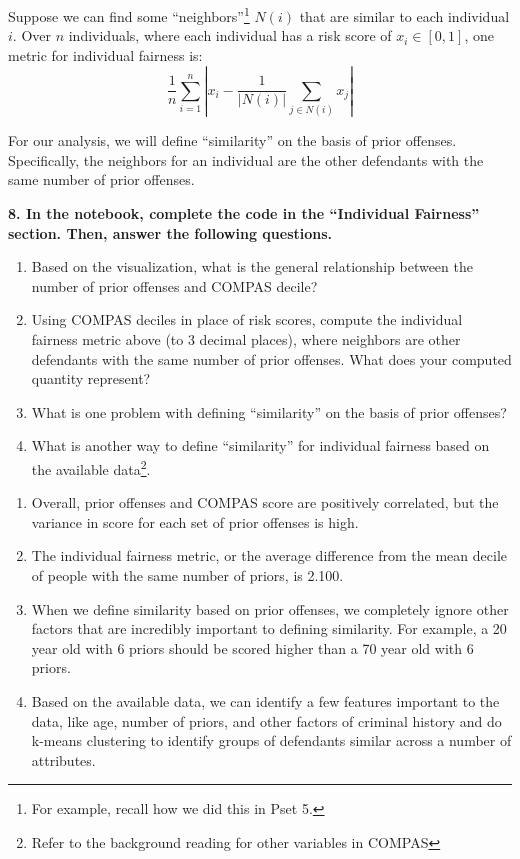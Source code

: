 \documentclass{article}
\begin{document}
Suppose we can find some ``neighbors''\footnote{For example, recall how we did this in Pset 5.} $N(i)$ that are similar to each individual $i$. Over $n$ individuals, where each individual has a risk score of $x_i \in [0,1]$, one metric for individual fairness is: 
$$\frac{1}{n} \sum_{i=1}^{n} \left| x_i - \frac{1}{|N(i)|} \sum_{j \in N(i)} x_j \right|$$

For our analysis, we will define ``similarity'' on the basis of prior offenses. Specifically, the neighbors for an individual are the other defendants with the same number of prior offenses.  

\textbf{8. In the notebook, complete the code in the ``Individual Fairness'' section. Then, answer the following questions.}
\begin{enumerate}[label=\Alph*.]
\item Based on the visualization, what is the general relationship between the number of prior offenses and COMPAS decile?
\item Using COMPAS deciles in place of risk scores, compute the individual fairness metric above (to 3 decimal places), where neighbors are other defendants with the same number of prior offenses. What does your computed quantity represent? 
\item What is one problem with defining ``similarity'' on the basis of prior offenses?
\item What is another way to define ``similarity'' for individual fairness based on the available data\footnote{Refer to the background reading for other variables in COMPAS}. 
\end{enumerate}
\bigskip
\begin{mdframed}
\begin{enumerate}[label=\Alph*.]
\item Overall, prior offenses and COMPAS score are positively correlated, but the variance in score for each set of prior offenses is high. 
\item The individual fairness metric, or the average difference from the mean decile of people with the same number of priors, is 2.100. 
\item When we define similarity based on prior offenses, we completely ignore other factors that are incredibly important to defining similarity. For example, a 20 year old with 6 priors should be scored higher than a 70 year old with 6 priors. 
\item Based on the available data, we can identify a few features important to the data, like age, number of priors, and other factors of criminal history and do k-means clustering to identify groups of defendants similar across a number of attributes. 
\end{enumerate}
\end{mdframed}
\bigskip
\end{document}
